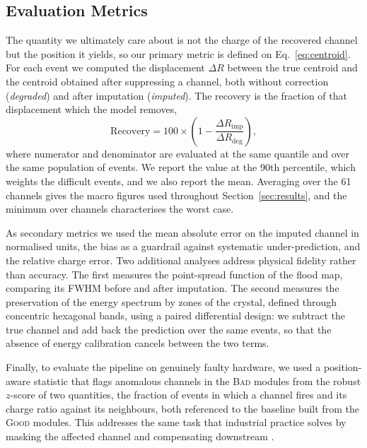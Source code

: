 \documentclass[10pt,conference]{IEEEtran}
\begin{document}
\subsection{Evaluation Metrics}
\label{sec:metrics}

The quantity we ultimately care about is not the charge of the recovered
channel but the position it yields, so our primary metric is defined on
Eq.~\ref{eq:centroid}. For each event we computed the displacement $\Delta R$
between the true centroid and the centroid obtained after suppressing a
channel, both without correction (\emph{degraded}) and after imputation
(\emph{imputed}). The recovery is the fraction of that displacement which the
model removes,
%
\begin{equation}
\mathrm{Recovery} = 100 \times
  \left( 1 - \frac{\Delta R_{\text{imp}}}{\Delta R_{\text{deg}}} \right),
\label{eq:recovery}
\end{equation}
%
where numerator and denominator are evaluated at the same quantile and over the
same population of events. We report the value at the 90th percentile, which
weights the difficult events, and we also report the mean. Averaging over the
61 channels gives the macro figures used throughout
Section~\ref{sec:results}, and the minimum over channels characterises the
worst case.

As secondary metrics we used the mean absolute error on the imputed channel in
normalised units, the bias as a guardrail against systematic under-prediction,
and the relative charge error. Two additional analyses address physical
fidelity rather than accuracy. The first measures the point-spread function of
the flood map, comparing its FWHM before and after imputation. The second
measures the preservation of the energy spectrum by zones of the crystal,
defined through concentric hexagonal bands, using a paired differential design:
we subtract the true channel and add back the prediction over the same events,
so that the absence of energy calibration cancels between the two terms.

Finally, to evaluate the pipeline on genuinely faulty hardware, we used a
position-aware statistic that flags anomalous channels in the \textsc{Bad}
modules from the robust $z$-score of two quantities, the fraction of events in
which a channel fires and its charge ratio against its neighbours, both
referenced to the baseline built from the \textsc{Good} modules. This addresses
the same task that industrial practice solves by masking the affected channel
and compensating downstream \cite{philips2015deadpixel}.
\end{document}
